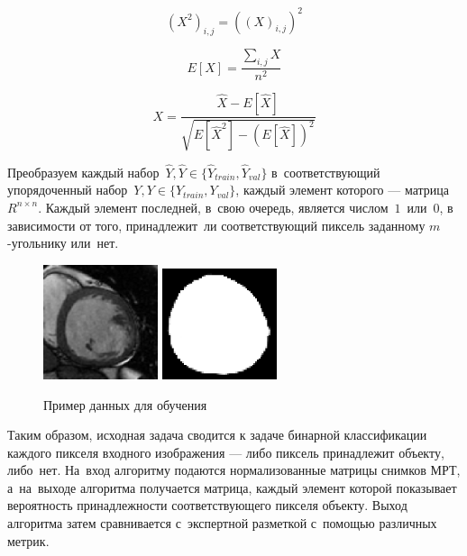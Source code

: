 \begin{equation}
\label{eq:input_squared}
(X^{2})_{i,j}=((X)_{i,j})^{2}
\end{equation}

\begin{equation}
\label{eq:input_expected_value}
E[X]=\frac{
  \sum_{i,j}X
}{
  n^{2}
}
\end{equation} 

\begin{equation}
\label{eq:input_normalized}
X = \frac{
  \hat{X} - E[\hat{X}]
}{\sqrt{
  E[\hat{X}^{2}] - (E[\hat{X}])^2
}}
\end{equation}

Преобразуем каждый набор~$\hat{Y},\hat{Y}\in{}\{\hat{Y}_{train},\hat{Y}_{val}\}$ 
в~соответствующий упорядоченный набор~$Y,Y\in{}\{Y_{train},Y_{val}\}$, 
каждый элемент которого — матрица~$R^{n\times{}n}$. Каждый элемент последней, 
в~свою очередь, является числом~$1$~или~$0$, в зависимости от того, принадлежит~ли 
соответствующий пиксель заданному \mbox{$m$-угольнику} или~нет.

\begin{figure}[hb]
  \begin{center}
    \includegraphics[width=0.3\textwidth,keepratio]{img/example-in}
    \includegraphics[width=0.3\textwidth,keepratio]{img/example-out}
  \end{center}
  \caption{Пример данных для обучения}
\end{figure}

Таким образом, исходная задача сводится к задаче бинарной классификации каждого пикселя 
входного изображения — либо пиксель принадлежит объекту, либо~нет. На~вход алгоритму 
подаются нормализованные матрицы снимков МРТ, а~на~выходе алгоритма получается матрица, 
каждый элемент которой показывает вероятность принадлежности соответствующего пикселя объекту. 
Выход алгоритма затем сравнивается с~экспертной разметкой с~помощью различных метрик.

